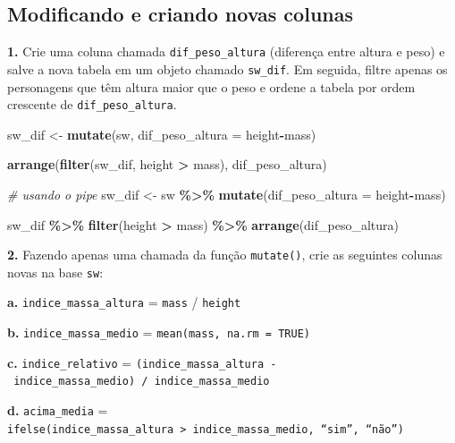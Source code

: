 \documentclass[
]{book}
\newenvironment{Shaded}{\begin{snugshade}}{\end{snugshade}}
\newcommand{\AttributeTok}[1]{\textcolor[rgb]{0.13,0.29,0.53}{#1}}
\newcommand{\CommentTok}[1]{\textcolor[rgb]{0.56,0.35,0.01}{\textit{#1}}}
\newcommand{\FunctionTok}[1]{\textcolor[rgb]{0.13,0.29,0.53}{\textbf{#1}}}
\newcommand{\NormalTok}[1]{#1}
\newcommand{\OtherTok}[1]{\textcolor[rgb]{0.56,0.35,0.01}{#1}}
\newcommand{\SpecialCharTok}[1]{\textcolor[rgb]{0.81,0.36,0.00}{\textbf{#1}}}
\begin{document}
\subsection{Modificando e criando novas colunas}\label{modificando-e-criando-novas-colunas}

\textbf{1.} Crie uma coluna chamada \texttt{dif\_peso\_altura} (diferença entre altura
e peso) e salve a nova tabela em um objeto chamado \texttt{sw\_dif}. Em seguida,
filtre apenas os personagens que têm altura maior que o peso e ordene a
tabela por ordem crescente de \texttt{dif\_peso\_altura}.

\begin{Shaded}
\begin{Highlighting}[]
\NormalTok{sw\_dif }\OtherTok{\textless{}{-}} \FunctionTok{mutate}\NormalTok{(sw, }\AttributeTok{dif\_peso\_altura =}\NormalTok{ height}\SpecialCharTok{{-}}\NormalTok{mass)}

\FunctionTok{arrange}\NormalTok{(}\FunctionTok{filter}\NormalTok{(sw\_dif, height }\SpecialCharTok{\textgreater{}}\NormalTok{ mass), dif\_peso\_altura)}

\CommentTok{\# usando o pipe}
\NormalTok{sw\_dif }\OtherTok{\textless{}{-}}\NormalTok{ sw }\SpecialCharTok{\%\textgreater{}\%} 
  \FunctionTok{mutate}\NormalTok{(}\AttributeTok{dif\_peso\_altura =}\NormalTok{ height}\SpecialCharTok{{-}}\NormalTok{mass)}

\NormalTok{sw\_dif }\SpecialCharTok{\%\textgreater{}\%} 
  \FunctionTok{filter}\NormalTok{(height }\SpecialCharTok{\textgreater{}}\NormalTok{ mass) }\SpecialCharTok{\%\textgreater{}\%} 
  \FunctionTok{arrange}\NormalTok{(dif\_peso\_altura)}
\end{Highlighting}
\end{Shaded}

\textbf{2.} Fazendo apenas uma chamada da função \texttt{mutate()}, crie as
seguintes colunas novas na base \texttt{sw}:

\textbf{a.} \texttt{indice\_massa\_altura} = \texttt{mass} / \texttt{height}

\textbf{b.} \texttt{indice\_massa\_medio} = \texttt{mean(mass,\ na.rm\ =\ TRUE)}

\textbf{c.} \texttt{indice\_relativo} =
\texttt{(indice\_massa\_altura\ -\ indice\_massa\_medio)\ /\ indice\_massa\_medio}

\textbf{d.} \texttt{acima\_media} =
\texttt{ifelse(indice\_massa\_altura\ \textgreater{}\ indice\_massa\_medio,\ “sim”,\ “não”)}
\end{document}
